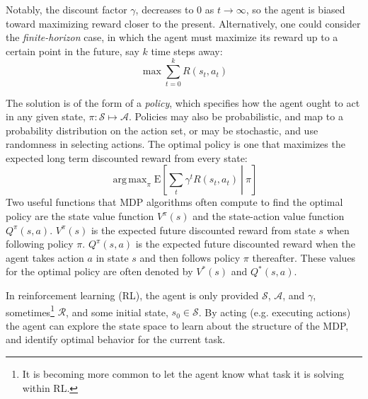 \documentclass[11pt]{article}
\newcommand\davenote[1]{\textcolor{blue}{Dave: #1}}
\DeclareMathOperator*{\argmax}{arg\,max}
\begin{document}
Notably, the discount factor $\gamma$, decreases to $0$ as $t \rightarrow \infty$, so the agent is biased toward maximizing reward closer to the present. Alternatively, one could consider the {\it finite-horizon} case, in which the agent must maximize its reward up to a certain point in the future, say $k$ time steps away:
\begin{equation}
\max \sum_{t=0}^{k} R(s_t,a_t)
\end{equation}

The solution is of the form of a {\it policy}, which specifies how the agent ought to act in any given state, $\pi : \mathcal{S} \mapsto \mathcal{A}$. Policies may also be probabilistic, and map to a probability distribution on the action set, or may be stochastic, and use randomness in selecting actions. The optimal policy is one that maximizes the expected long term discounted reward from every state:
\begin{equation}
\argmax_\pi \left.\text{E}\left[\sum_t \gamma^t R(s_t,a_t)\ \right|\ \pi\right]
\end{equation}
Two useful functions that MDP algorithms often compute to find the optimal policy are the state value function $V^{\pi}(s)$ and the state-action value function $Q^{\pi}(s, a)$. $V^{\pi}(s)$ is the expected future discounted reward from state $s$ when following policy $\pi$. $Q^{\pi}(s, a)$ is the expected future discounted reward when the agent takes action $a$ in state $s$ and then follows policy $\pi$ thereafter. These values for the optimal policy are often denoted by $V^*(s)$ and $Q^*(s, a)$.


In reinforcement learning (RL), the agent is only provided $\mathcal{S}$, $\mathcal{A}$, and $\gamma$, sometimes\footnote{It is becoming more common to let the agent know what task it is solving within RL.} $\mathcal{R}$, and some initial state, $s_0 \in \mathcal{S}$. By acting (e.g. executing actions) the agent can explore the state space to learn about the structure of the MDP, and identify optimal behavior for the current task.

\end{document}
